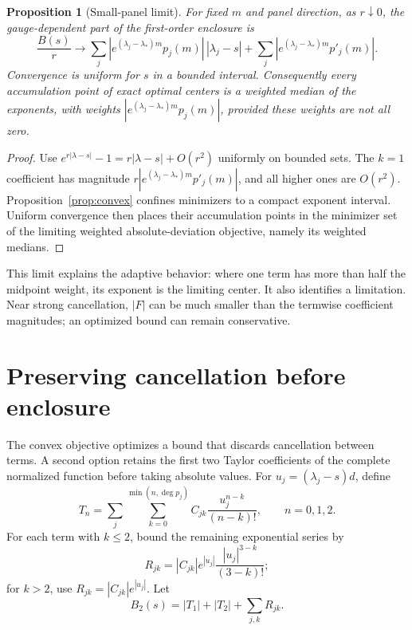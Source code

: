 \documentclass[11pt,a4paper]{article}
\newtheorem{proposition}[theorem]{Proposition}
\begin{document}
\begin{proposition}[Small-panel limit]\label{prop:median}
For fixed $m$ and panel direction, as $r\downarrow0$, the gauge-dependent part of the first-order enclosure is
\begin{equation}\label{eq:median}
 \frac{B(s)}r\longrightarrow
 \sum_j |e^{(\lambda_j-\lambda_*)m}p_j(m)|\,|\lambda_j-s|
 +\sum_j |e^{(\lambda_j-\lambda_*)m}p'_j(m)|.
\end{equation}
Convergence is uniform for $s$ in a bounded interval. Consequently every accumulation point of exact optimal centers is a weighted median of the exponents, with weights $|e^{(\lambda_j-\lambda_*)m}p_j(m)|$, provided these weights are not all zero.
\end{proposition}
\begin{proof}
Use $e^{r|\lambda-s|}-1=r|\lambda-s|+O(r^2)$ uniformly on bounded sets. The $k=1$ coefficient has magnitude $r|e^{(\lambda_j-\lambda_*)m}p'_j(m)|$, and all higher ones are $O(r^2)$. Proposition~\ref{prop:convex} confines minimizers to a compact exponent interval. Uniform convergence then places their accumulation points in the minimizer set of the limiting weighted absolute-deviation objective, namely its weighted medians.
\end{proof}

This limit explains the adaptive behavior: where one term has more than half the midpoint weight, its exponent is the limiting center. It also identifies a limitation. Near strong cancellation, $|F|$ can be much smaller than the termwise coefficient magnitudes; an optimized bound can remain conservative.

\section{Preserving cancellation before enclosure}
\label{sec:jets}
The convex objective optimizes a bound that discards cancellation between terms. A second option retains the first two Taylor coefficients of the complete normalized function before taking absolute values. For $u_j=(\lambda_j-s)d$, define
\begin{equation}
 T_n=\sum_j\sum_{k=0}^{\min(n,\deg p_j)}
       C_{jk}\frac{u_j^{n-k}}{(n-k)!},\qquad n=0,1,2.
\end{equation}
For each term with $k\le2$, bound the remaining exponential series by
\begin{equation}
 R_{jk}=|C_{jk}|e^{|u_j|}\frac{|u_j|^{3-k}}{(3-k)!};
\end{equation}
for $k>2$, use $R_{jk}=|C_{jk}|e^{|u_j|}$. Let
\begin{equation}\label{eq:jetbound}
 B_2(s)=|T_1|+|T_2|+\sum_{j,k}R_{jk}.
\end{equation}
\end{document}
